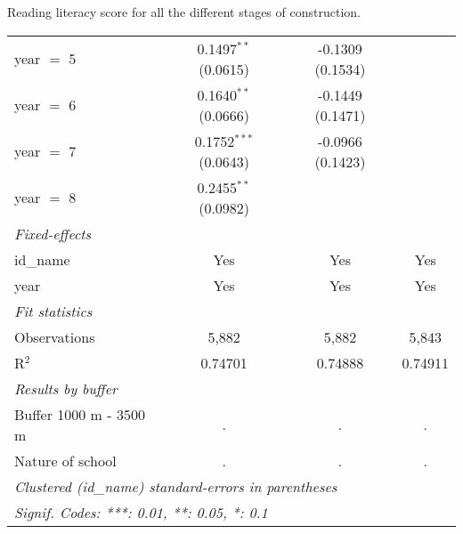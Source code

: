 \documentclass[9pt]{beamer}
\begin{document}
\begin{frame}{Reading literacy score for all the different stages of construction.}
\begin{center}
\begin{tabular}{lccc}
   year $=$ 5   & 0.1497$^{**}$ (0.0615)  & -0.1309 (0.1534)        &   \\    
   year $=$ 6   & 0.1640$^{**}$ (0.0666)   & -0.1449 (0.1471)         &   \\
   year $=$ 7   & 0.1752$^{***}$ (0.0643)  & -0.0966 (0.1423)        &   \\   
   year $=$ 8   & 0.2455$^{**}$ (0.0982)   &                &   \\   
   \midrule
   \emph{Fixed-effects}\\
   id\_name     & Yes            & Yes            & Yes\\  
   year         & Yes            & Yes            & Yes\\  
   \midrule
   \emph{Fit statistics}\\
   Observations & 5,882          & 5,882          & 5,843\\  
   R$^2$        & 0.74701        & 0.74888        & 0.74911\\  
   \midrule  
   \emph{Results by buffer}\\
   Buffer 1000 m - 3500 m  &  .\hyperlink{10p_read_buf}{\beamergotobutton{ }}            &  .\hyperlink{50p_read_buf}{\beamergotobutton{}}             &  .\hyperlink{100p_read_buf}{\beamergotobutton{}}   \\  
    Nature of school &  .\hyperlink{10p_read_nat}{\beamerbutton{ }}            &  .\hyperlink{50p_read_nat}{\beamerbutton{ }}             &  .\hyperlink{100p_read_nat}{\beamerbutton{ }}    \\   
   \midrule  
   \multicolumn{4}{l}{\emph{Clustered (id\_name) standard-errors in parentheses}}\\
   \multicolumn{4}{l}{\emph{Signif. Codes: ***: 0.01, **: 0.05, *: 0.1}}\\
\midrule
\end{tabular}
 
 \end{center}
\end{frame}




\end{document}
